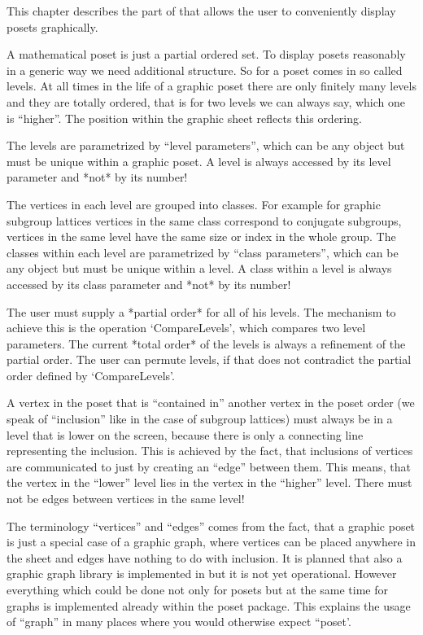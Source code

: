 
This chapter describes the part of {\XGAP} that allows the user to
conveniently display posets graphically.


A mathematical poset is just a partial ordered set. To display posets
reasonably in a generic way we need additional structure. So for {\XGAP} a
poset comes in so called levels. At all times in the life of a graphic
poset there are only finitely many levels and they are totally ordered,
that is for two levels we can always say, which one is ``higher''. The
position within the graphic sheet reflects this ordering.

The levels are parametrized by ``level parameters'', which can be any
{\GAP} object but must be unique within a graphic poset. A level is always
accessed by its level parameter and *not* by its number!

The vertices in each level are grouped into classes. For example for 
graphic subgroup lattices vertices in the same class correspond to conjugate
subgroups, vertices in the same level have the same size or index in the
whole group. The classes within each level are parametrized by ``class
parameters'', which can be any {\GAP} object but must be unique within a
level. A class within a level is always accessed by its class parameter and 
*not* by its number!

The user must supply a *partial order* for all of his levels. The mechanism 
to achieve this is the operation `CompareLevels', which compares two level
parameters. The current *total order* of the levels is always a refinement
of the partial order. The user can permute levels, if that does not
contradict the partial order defined by `CompareLevels'.

A vertex in the poset that is ``contained in'' another vertex in the poset
order (we speak of ``inclusion'' like in the case of subgroup lattices)
must always be in a level that is lower on the screen, because there 
is only a connecting line representing the inclusion. This is achieved by
the fact, that inclusions of vertices are communicated to {\XGAP} just by
creating an ``edge'' between them. This means, that the vertex in the
``lower'' level lies in the vertex in the ``higher'' level. There must not
be edges between vertices in the same level!

The terminology ``vertices'' and ``edges'' comes from the fact, that a
graphic poset is just a special case of a graphic graph, where vertices can 
be placed anywhere in the sheet and edges have nothing to do with
inclusion. It is planned that also a graphic graph library is implemented
in {\XGAP} but it is not yet operational. However everything which could be 
done not only for posets but at the same time for graphs is implemented
already within the poset package. This explains the usage of ``graph'' in
many places where you would otherwise expect ``poset'.

